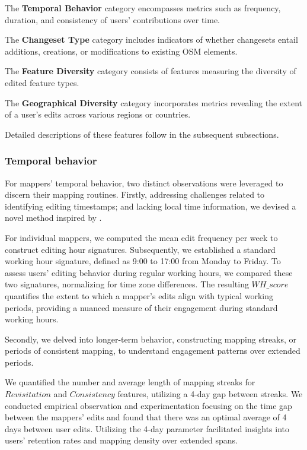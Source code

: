 \documentclass[manuscript,screen,review]{acmart}
\begin{document}
The \textbf{Temporal Behavior} category encompasses metrics such as frequency, duration, and consistency of users' contributions over time. 

The \textbf{Changeset Type} category includes indicators of whether changesets entail additions, creations, or modifications to existing OSM elements.

The \textbf{Feature Diversity} category consists of features measuring the diversity of edited feature types.

The \textbf{Geographical Diversity} category incorporates metrics revealing the extent of a user's edits across various regions or countries.

Detailed descriptions of these features follow in the subsequent subsections.

\subsubsection{Temporal behavior}

For mappers' temporal behavior, two distinct observations were leveraged to discern their mapping routines. Firstly, addressing challenges related to identifying editing timestamps; and lacking local time information, we devised a novel method inspired by \cite{Veselovsky22}.

For individual mappers, we computed the mean edit frequency per week to construct editing hour signatures. Subsequently, we established a standard working hour signature, defined as 9:00 to 17:00 from Monday to Friday. To assess users' editing behavior during regular working hours, we compared these two signatures, normalizing for time zone differences. The resulting $WH\_score$ quantifies the extent to which a mapper's edits align with typical working periods, providing a nuanced measure of their engagement during standard working hours.

Secondly, we delved into longer-term behavior, constructing mapping streaks, or periods of consistent mapping, to understand engagement patterns over extended periods. 

We quantified the number and average length of mapping streaks for $Revisitation$ and $Consistency$ features, utilizing a 4-day gap between streaks. We conducted empirical observation and experimentation focusing on the time gap between the mappers’ edits and found that there was an optimal average of 4 days between user edits. Utilizing the 4-day parameter facilitated insights into users' retention rates and mapping density over extended spans.
\end{document}
